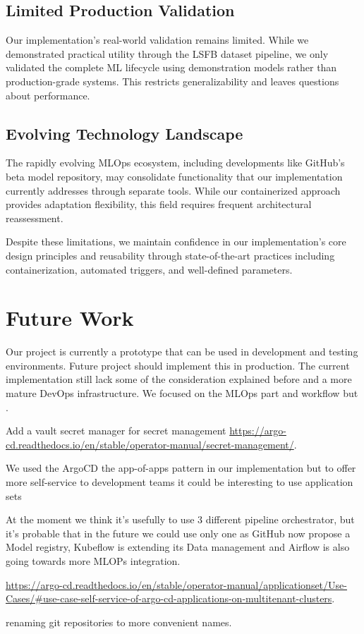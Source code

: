 \subsection*{Limited Production Validation}
Our implementation's real-world validation remains limited.
While we demonstrated practical utility through the LSFB dataset pipeline, we only validated the complete ML lifecycle using demonstration models rather than production-grade systems.
This restricts generalizability and leaves questions about performance.
\subsection*{Evolving Technology Landscape}
The rapidly evolving MLOps ecosystem, including developments like GitHub's beta model repository, may consolidate functionality that our implementation currently addresses through separate tools.
While our containerized approach provides adaptation flexibility, this field requires frequent architectural reassessment.

Despite these limitations, we maintain confidence in our implementation's core design principles and reusability through state-of-the-art practices including containerization, automated triggers, and well-defined parameters.

\section{Future Work}\label{sec:future-work}
Our project is currently a prototype that can be used in development and testing environments.
Future project should implement this in production.
The current implementation still lack some of the consideration explained before and a more mature DevOps infrastructure.
We focused on the MLOps part and workflow but .

Add a vault secret manager for secret management \url{https://argo-cd.readthedocs.io/en/stable/operator-manual/secret-management/}.

We used the ArgoCD the app-of-apps pattern in our implementation but to offer more self-service to development teams it could be interesting to use application sets

At the moment we think it's usefully to use 3 different pipeline orchestrator, but it's probable that in the future we could use only one as
GitHub now propose a Model registry, Kubeflow is extending its Data management and Airflow is also going towards more MLOPs integration.

\url{https://argo-cd.readthedocs.io/en/stable/operator-manual/applicationset/Use-Cases/#use-case-self-service-of-argo-cd-applications-on-multitenant-clusters}.

renaming git repositories to more convenient names.





